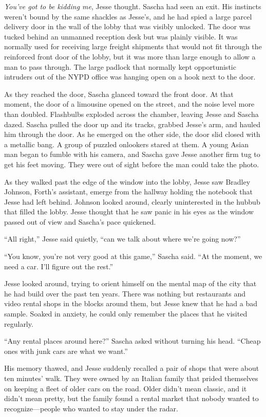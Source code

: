 \documentclass[12pt]{book}
\begin{document}
\emph{You've got to be kidding me}, Jesse thought.  Sascha had seen an exit.  His instincts weren't bound by the same shackles as Jesse's, and he had spied a large parcel delivery door in the wall of the lobby that was visibly unlocked.  The door was tucked behind an unmanned reception desk but was plainly visible.  It was normally used for receiving large freight shipments that would not fit through the reinforced front door of the lobby, but it was more than large enough to allow a man to pass through.  The large padlock that normally kept opportunistic intruders out of the NYPD office was hanging open on a hook next to the door.

As they reached the door, Sascha glanced toward the front door.  At that moment, the door of a limousine opened on the street, and the noise level more than doubled.  Flashbulbs exploded across the chamber, leaving Jesse and Sascha dazed.  Sascha pulled the door up and its tracks, grabbed Jesse's arm, and hauled him through the door.  As he emerged on the other side, the door slid closed with a metallic bang.  A group of puzzled onlookers stared at them.  A young Asian man began to fumble with his camera, and Sascha gave Jesse another firm tug to get his feet moving.  They were out of sight before the man could take the photo.

As they walked past the edge of the window into the lobby, Jesse saw Bradley Johnson, Forth's assistant, emerge from the hallway holding the notebook that Jesse had left behind.  Johnson looked around, clearly uninterested in the hubbub that filled the lobby.  Jesse thought that he saw panic in his eyes as the window passed out of view and Sascha's pace quickened.

``All right,'' Jesse said quietly, ``can we talk about where we're going now?''

``You know, you're not very good at this game,'' Sascha said.  ``At the moment, we need a car.  I'll figure out the rest.''

Jesse looked around, trying to orient himself on the mental map of the city that he had build over the past ten years.  There was nothing but restaurants and video rental shops in the blocks around them, but Jesse knew that he had a bad sample.  Soaked in anxiety, he could only remember the places that he visited regularly.

``Any rental places around here?'' Sascha asked without turning his head.  ``Cheap ones with junk cars are what we want.''

His memory thawed, and Jesse suddenly recalled a pair of shops that were about ten minutes' walk.  They were owned by an Italian family that prided themselves on keeping a fleet of older cars on the road.  Older didn't mean classic, and it didn't mean pretty, but the family found a rental market that nobody wanted to recognize---people who wanted to stay under the radar.
\end{document}
